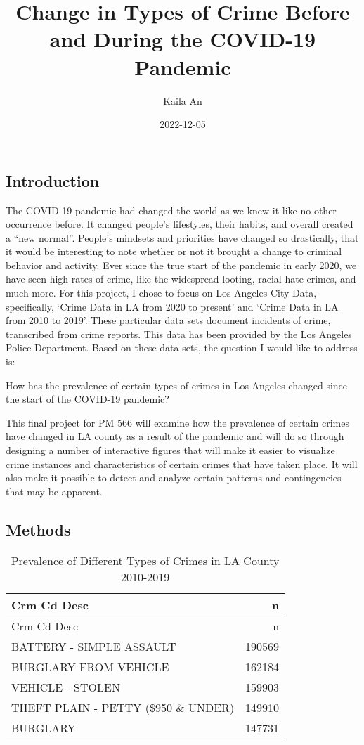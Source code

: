\documentclass[
]{article}
\title{Change in Types of Crime Before and During the COVID-19 Pandemic}
\author{Kaila An}
\date{2022-12-05}
\begin{document}
\maketitle

\hypertarget{introduction}{%
\subsection{Introduction}\label{introduction}}

The COVID-19 pandemic had changed the world as we knew it like no other
occurrence before. It changed people's lifestyles, their habits, and
overall created a ``new normal''. People's mindsets and priorities have
changed so drastically, that it would be interesting to note whether or
not it brought a change to criminal behavior and activity. Ever since
the true start of the pandemic in early 2020, we have seen high rates of
crime, like the widespread looting, racial hate crimes, and much more.
For this project, I chose to focus on Los Angeles City Data,
specifically, `Crime Data in LA from 2020 to present' and `Crime Data in
LA from 2010 to 2019'. These particular data sets document incidents of
crime, transcribed from crime reports. This data has been provided by
the Los Angeles Police Department. Based on these data sets, the
question I would like to address is:

How has the prevalence of certain types of crimes in Los Angeles changed
since the start of the COVID-19 pandemic?

This final project for PM 566 will examine how the prevalence of certain
crimes have changed in LA county as a result of the pandemic and will do
so through designing a number of interactive figures that will make it
easier to visualize crime instances and characteristics of certain
crimes that have taken place. It will also make it possible to detect
and analyze certain patterns and contingencies that may be apparent.

\hypertarget{methods}{%
\subsection{Methods}\label{methods}}

\begin{longtable}[]{@{}lr@{}}
\caption{Prevalence of Different Types of Crimes in LA County
2010-2019}\tabularnewline
\toprule()
Crm Cd Desc & n \\
\midrule()
\endfirsthead
\toprule()
Crm Cd Desc & n \\
\midrule()
\endhead
BATTERY - SIMPLE ASSAULT & 190569 \\
BURGLARY FROM VEHICLE & 162184 \\
VEHICLE - STOLEN & 159903 \\
THEFT PLAIN - PETTY (\$950 \& UNDER) & 149910 \\
BURGLARY & 147731 \\
\bottomrule()
\end{longtable}
\end{document}
